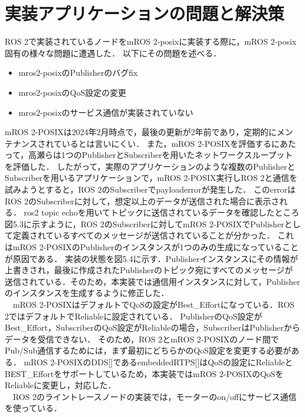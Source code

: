 \section{実装アプリケーションの問題と解決策}
ROS 2で実装されているノードをmROS 2-posixに実装する際に，mROS 2-posix固有の様々な問題に遭遇した．
以下にその問題を述べる．
\begin{itemize}
    \item mros2-posixのPublisherのバグfix
    \item mros2-posixのQoS設定の変更
    \item mros2-posixのサービス通信が実装されていない
\end{itemize}
mROS 2-POSIXは2024年2月時点で，最後の更新が2年前であり，定期的にメンテナンスされているとは言いにくい．
また，mROS 2-POSIXを評価するにあたって，高瀬らは1つのPublisherとSubscriberを用いたネットワークスループットを評価した．
したがって，実際のアプリケーションのような複数のPublisherとSubscriberを用いるアプリケーションで，mROS 2-POSIX実行しROS 2と通信を試みようとすると，ROS 2のSubscriberでpayloaderrorが発生した．
このerrorはROS 2のSubscriberに対して，想定以上のデータが送信された場合に表示される．
ros2 topic echoを用いてトピックに送信されているデータを確認したところ図5.3に示すように，ROS 2のSubscriberに対してmROS 2-POSIXでPublisherとして定義されているすべてのメッセージが送信されていることが分かった．
これはmROS 2-POSIXのPublisherのインスタンスが1つのみの生成になっていることが原因である．
実装の状態を図5.4に示す．Publisherインスタンスにその情報が上書きされ，最後に作成されたPublisherのトピック宛にすべてのメッセージが送信されている．そのため，本実装では通信用インスタンスに対して，Publisherのインスタンスを生成するように修正した．
\\　mROS 2-POSIXはデフォルトでQoSの設定がBest\_Effortになっている．ROS 2ではデフォルトでReliableに設定されている．
PublisherのQoS設定がBest\_Effort，SubscriberのQoS設定がReliableの場合，SubscriberはPublisherからデータを受信できない．
そのため，ROS 2とmROS 2-POSIXのノード間でPub/Sub通信するためには，まず最初にどちらかのQoS設定を変更する必要がある．
mROS 2-POSIXのDDS[]であるembeddedRTPS[]はQoSの設定にReliableとBEST\_Effortをサポートしているため，本実装ではmROS 2-POSIXのQoSをReliableに変更し，対応した．
\\　ROS 2のライントレースノードの実装では，モーターのon/offにサービス通信を使っている．

